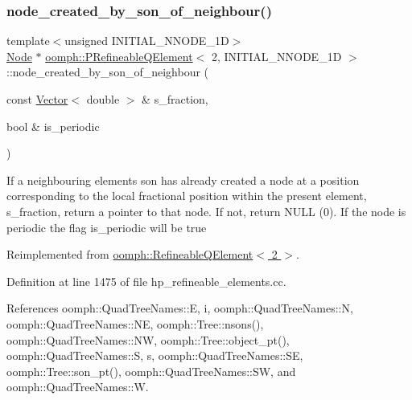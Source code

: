 \subsubsection{\texorpdfstring{node\+\_\+created\+\_\+by\+\_\+son\+\_\+of\+\_\+neighbour()}{node\_created\_by\_son\_of\_neighbour()}}
{\footnotesize\ttfamily template$<$unsigned I\+N\+I\+T\+I\+A\+L\+\_\+\+N\+N\+O\+D\+E\+\_\+1D$>$ \\
\hyperlink{classoomph_1_1Node}{Node} $\ast$ \hyperlink{classoomph_1_1PRefineableQElement}{oomph\+::\+P\+Refineable\+Q\+Element}$<$ 2, I\+N\+I\+T\+I\+A\+L\+\_\+\+N\+N\+O\+D\+E\+\_\+1D $>$\+::node\+\_\+created\+\_\+by\+\_\+son\+\_\+of\+\_\+neighbour (\begin{DoxyParamCaption}\item[{const \hyperlink{classoomph_1_1Vector}{Vector}$<$ double $>$ \&}]{s\+\_\+fraction,  }\item[{bool \&}]{is\+\_\+periodic }\end{DoxyParamCaption})\hspace{0.3cm}{\ttfamily [virtual]}}

If a neighbouring element\textquotesingle{}s son has already created a node at a position corresponding to the local fractional position within the present element, s\+\_\+fraction, return a pointer to that node. If not, return N\+U\+LL (0). If the node is periodic the flag is\+\_\+periodic will be true 

Reimplemented from \hyperlink{classoomph_1_1RefineableQElement_3_012_01_4_ae989507794716d3ab8d0d2fd32dce28f}{oomph\+::\+Refineable\+Q\+Element$<$ 2 $>$}.



Definition at line 1475 of file hp\+\_\+refineable\+\_\+elements.\+cc.



References oomph\+::\+Quad\+Tree\+Names\+::E, i, oomph\+::\+Quad\+Tree\+Names\+::N, oomph\+::\+Quad\+Tree\+Names\+::\+NE, oomph\+::\+Tree\+::nsons(), oomph\+::\+Quad\+Tree\+Names\+::\+NW, oomph\+::\+Tree\+::object\+\_\+pt(), oomph\+::\+Quad\+Tree\+Names\+::S, s, oomph\+::\+Quad\+Tree\+Names\+::\+SE, oomph\+::\+Tree\+::son\+\_\+pt(), oomph\+::\+Quad\+Tree\+Names\+::\+SW, and oomph\+::\+Quad\+Tree\+Names\+::W.

\mbox{\label{classoomph_1_1PRefineableQElement_3_012_00_01INITIAL__NNODE__1D_01_4_aa74bd994a95736da7c0c92297959b026}} 
